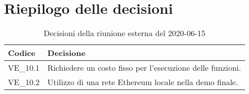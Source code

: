 \section{Riepilogo delle decisioni}
\begin{longtable}{
	 >{\centering}p{} >{}p{} }
	\caption{Decisioni della riunione esterna del 2020-06-15}\\

	\textbf{\color{white}Codice} &
	\textbf{\color{white}Decisione}
	\tabularnewline
	\endhead

	VE\_10.1 & Richiedere un costo fisso per l'esecuzione delle funzioni. \\
	VE\_10.2 & Utilizzo di una rete Ethereum locale nella demo finale. \\
\end{longtable}

